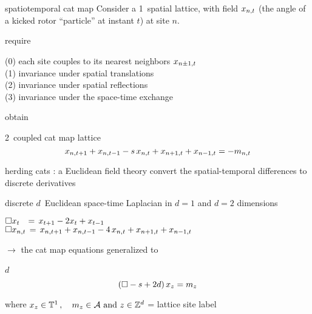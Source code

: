 \begin{frame}{spatiotemporal cat map
}
Consider
a 1\dmn\ spatial lattice, with field $x_{n,t}$  (the angle of a kicked
rotor ``particle'' at instant $t$)  at site $n$.

\bigskip

require

\medskip

(0) each site couples to
its nearest neighbors $x_{n\pm1,t}$
\\(1) invariance under
spatial translations
\\(2) invariance under spatial reflections
\\(3) invariance under the space-time exchange

\bigskip

obtain
\begin{block}{2\dmn\ coupled cat map lattice}
\[
x_{n,t+1} + x_{n,t-1} - s \, x_{n,t} + x_{n+1,t} + x_{n-1, t}
     =-{m_{n,t}}
\] %
\end{block}

\vfill


\end{frame}

\begin{frame}{herding cats : a Euclidean field theory
}
convert the spatial-temporal differences to discrete derivatives

\bigskip

discrete $d$\dmn\ Euclidean space-time Laplacian
in $d=1$ and $d=2$ dimensions

\bigskip

\(
\Box x_t \;\;\,=\, x_{t+1} - 2x_{t} + x_{t-1}
\)\\ \(
\Box x_{n,t} \,=\, x_{n,t+1} + x_{n,t-1}
- 4 \, x_{n,t} + x_{n+1,t} + x_{n-1, t}
\)

\medskip

$\to$ the cat map equations generalized  to
\begin{block}{$d$\dmn\ \catlatt}
\[
 (\Box -s+2d)\,x_{z} = m_z
\] %

\medskip

\end{block}

\bigskip

where
\(
  x_{z} \in  \mathbb{T}^{1}
    \,, \quad
  {\ensuremath{m_{z}}} \in \mathcal{A}
    \mbox{  and  }
  z\in \mathbb{Z}^{d}
\) = lattice site label
\end{frame}


